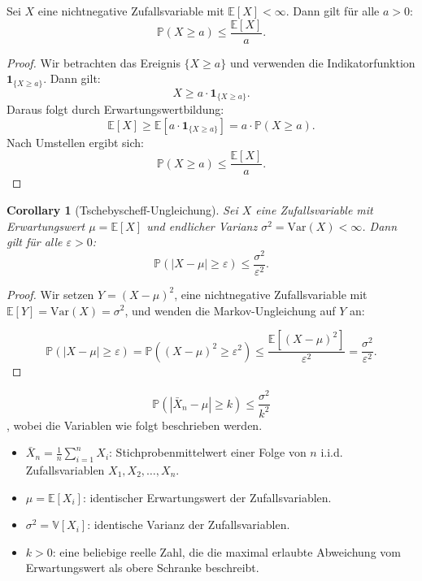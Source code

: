 \documentclass[aodsor,preprint]{imsart}
\numberwithin{equation}{section}
\theoremstyle{plain}
\newtheorem{corollary}[thm]{Corollary}
\begin{document}
\begin{theorem}
Sei \( X \) eine nichtnegative Zufallsvariable mit \( \mathbb{E}[X] < \infty \). Dann gilt für alle \( a > 0 \):
\[
\mathbb{P}(X \geq a) \leq \frac{\mathbb{E}[X]}{a}.
\]
\end{theorem}

\begin{proof}
Wir betrachten das Ereignis \( \{ X \geq a \} \) und verwenden die Indikatorfunktion \( \mathbf{1}_{\{X \geq a\}} \). Dann gilt:
\[
X \geq a \cdot \mathbf{1}_{\{X \geq a\}}.
\]
Daraus folgt durch Erwartungswertbildung:
\[
\mathbb{E}[X] \geq \mathbb{E}[a \cdot \mathbf{1}_{\{X \geq a\}}] = a \cdot \mathbb{P}(X \geq a).
\]
Nach Umstellen ergibt sich:
\[
\mathbb{P}(X \geq a) \leq \frac{\mathbb{E}[X]}{a}.
\]
\end{proof}

\begin{corollary}[Tschebyscheff-Ungleichung]
Sei \( X \) eine Zufallsvariable mit Erwartungswert \( \mu = \mathbb{E}[X] \) und endlicher Varianz \( \sigma^2 = \text{Var}(X) < \infty \). Dann gilt für alle \( \varepsilon > 0 \):
\[
\mathbb{P}(|X - \mu| \geq \varepsilon) \leq \frac{\sigma^2}{\varepsilon^2}.
\]
\end{corollary}

\begin{proof}
Wir setzen \( Y = (X - \mu)^2 \), eine nichtnegative Zufallsvariable mit \( \mathbb{E}[Y] = \text{Var}(X) = \sigma^2 \), und wenden die Markov-Ungleichung auf \( Y \) an:

\[
\mathbb{P}(|X - \mu| \geq \varepsilon)
= \mathbb{P}((X - \mu)^2 \geq \varepsilon^2)
\leq \frac{\mathbb{E}[(X - \mu)^2]}{\varepsilon^2}
= \frac{\sigma^2}{\varepsilon^2}.
\]
\end{proof}


\[
\mathbb{P} \left( \left| \bar{X}_n - \mu \right| \geq k \right) \leq \frac{\sigma^2}{k^2}
\], wobei die Variablen wie folgt beschrieben werden.
\begin{itemize}
  \item \( \bar{X}_n = \frac{1}{n} \sum_{i=1}^n X_i \): Stichprobenmittelwert einer Folge von \( n \) i.i.d. Zufallsvariablen \( X_1, X_2, \dots, X_n \).
  \item \( \mu = \mathbb{E}[X_i] \): identischer Erwartungswert der Zufallsvariablen.
  \item \( \sigma^2 = \mathbb{V}[X_i] \): identische Varianz der Zufallsvariablen.
    \item \(k > 0 \): eine beliebige reelle Zahl, die die maximal erlaubte Abweichung vom Erwartungswert als obere Schranke beschreibt.
\end{itemize}
\end{document}
